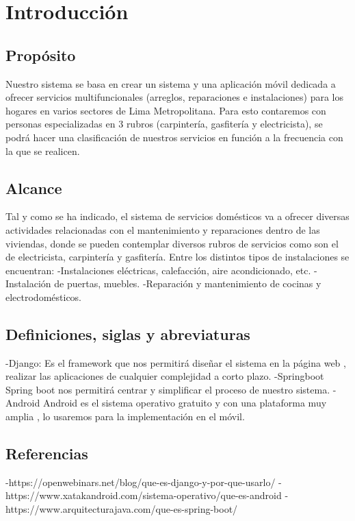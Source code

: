 \chapter{Introducción}

\section{Propósito}
Nuestro sistema se basa en crear un sistema y una aplicación móvil dedicada a ofrecer servicios multifuncionales (arreglos, reparaciones e instalaciones) para los hogares en varios sectores de Lima Metropolitana. Para esto contaremos con personas especializadas en 3 rubros (carpintería, gasfitería y electricista), se podrá hacer una clasificación de nuestros servicios en función a la frecuencia con la que se realicen.
\section{Alcance}
Tal y como se ha indicado, el sistema de servicios domésticos va a ofrecer diversas actividades relacionadas con el mantenimiento y reparaciones dentro de las viviendas, donde se pueden contemplar diversos rubros de servicios como son el de electricista, carpintería y gasfitería.
Entre los distintos tipos de instalaciones se encuentran:
-Instalaciones eléctricas, calefacción, aire acondicionado, etc.
-Instalación de puertas, muebles.
-Reparación y mantenimiento de cocinas y electrodomésticos.


\section{Definiciones, siglas y abreviaturas}
-Django:
Es el framework que nos permitirá diseñar el sistema en la página web , realizar las aplicaciones de cualquier complejidad a corto plazo.
-Springboot
Spring boot nos permitirá centrar y simplificar el proceso de nuestro sistema.
-Android
Android es el sistema operativo gratuito y con una plataforma muy amplia , lo usaremos para la implementación en el móvil.


\section{Referencias}
-https://openwebinars.net/blog/que-es-django-y-por-que-usarlo/
-https://www.xatakandroid.com/sistema-operativo/que-es-android
-https://www.arquitecturajava.com/que-es-spring-boot/
